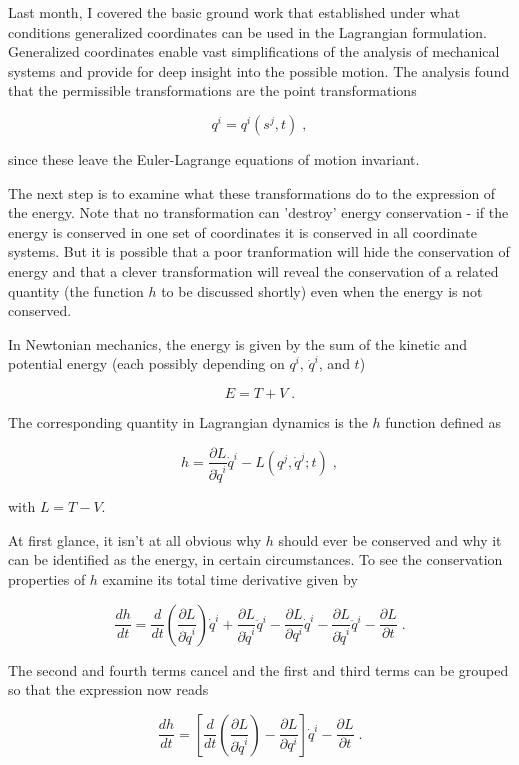 \documentclass[12pt]{article}
\begin{document}
Last month, I covered the basic ground work that established under what conditions generalized coordinates can be used in the Lagrangian formulation.  Generalized coordinates enable vast simplifications of the analysis of mechanical systems and provide for deep insight into the possible motion.  The analysis found that the permissible transformations are the point transformations 

\[q^i = q^i(s^j,t) \; ,\]

since these leave the Euler-Lagrange equations of motion invariant.  

The next step is to examine what these transformations do to the expression of the energy. Note that no transformation can 'destroy' energy conservation - if the energy is conserved in one set of coordinates it is conserved in all coordinate systems.  But it is possible that a poor tranformation will hide the conservation of energy and that a clever transformation will reveal the conservation of a related quantity (the function $h$ to be discussed shortly) even when the energy is not conserved. 

In Newtonian mechanics, the energy is given by the sum of the kinetic and potential energy (each possibly depending on $q^i$, ${\dot q}^i$, and $t$)

\[ E = T + V \; .\]

The corresponding quantity in Lagrangian dynamics is the $h$ function defined as

\[ h = \frac{\partial L}{\partial {\dot q}^i} {\dot q}^i - L(q^j,{\dot q^j};t) \; ,\]

with $L = T - V$.

At first glance, it isn't at all obvious why $h$ should ever be conserved and why it can be identified as the energy, in certain circumstances.  To see the conservation properties of $h$ examine its total time derivative given by

\[ \frac{d h}{d t} = \frac{d}{d t} \left(\frac{\partial L}{\partial {\dot q}^i} \right) {\dot q}^i + \frac{\partial L}{\partial {\dot q}^i} {\ddot q}^i - \frac{\partial L}{\partial q^i} {\dot q}^i - \frac{\partial L}{\partial {\dot q}^i} {\ddot q}^i - \frac{\partial L}{\partial t} \; . \]

The second and fourth terms cancel and the first and third terms can be grouped so that the expression now reads

\[ \frac{d h}{d t} = \left[ \frac{d}{d t} \left(\frac{\partial L}{\partial {\dot q}^i} \right) - \frac{\partial L}{\partial q^i} \right] {\dot q}^i - \frac{\partial L}{\partial t} \; . \]
\end{document}
